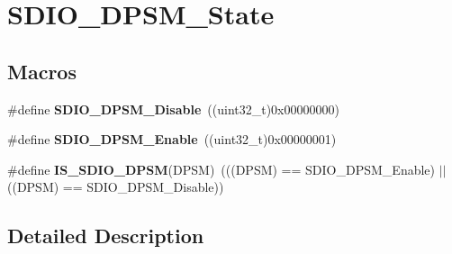 \hypertarget{group___s_d_i_o___d_p_s_m___state}{}\section{S\+D\+I\+O\+\_\+\+D\+P\+S\+M\+\_\+\+State}
\label{group___s_d_i_o___d_p_s_m___state}
\subsection*{Macros}
\begin{DoxyCompactItemize}
\item 
\hypertarget{group___s_d_i_o___d_p_s_m___state_ga156a9f6ab87a46dcb99ddd7462ca064b}{}\#define {\bfseries S\+D\+I\+O\+\_\+\+D\+P\+S\+M\+\_\+\+Disable}~((uint32\+\_\+t)0x00000000)\label{group___s_d_i_o___d_p_s_m___state_ga156a9f6ab87a46dcb99ddd7462ca064b}

\item 
\hypertarget{group___s_d_i_o___d_p_s_m___state_ga22bc12465c1cf839145619a859276c37}{}\#define {\bfseries S\+D\+I\+O\+\_\+\+D\+P\+S\+M\+\_\+\+Enable}~((uint32\+\_\+t)0x00000001)\label{group___s_d_i_o___d_p_s_m___state_ga22bc12465c1cf839145619a859276c37}

\item 
\hypertarget{group___s_d_i_o___d_p_s_m___state_gac87a2d7a8fc417a4514d733be50e6d63}{}\#define {\bfseries I\+S\+\_\+\+S\+D\+I\+O\+\_\+\+D\+P\+S\+M}(D\+P\+S\+M)~(((D\+P\+S\+M) == S\+D\+I\+O\+\_\+\+D\+P\+S\+M\+\_\+\+Enable) $\vert$$\vert$ ((D\+P\+S\+M) == S\+D\+I\+O\+\_\+\+D\+P\+S\+M\+\_\+\+Disable))\label{group___s_d_i_o___d_p_s_m___state_gac87a2d7a8fc417a4514d733be50e6d63}

\end{DoxyCompactItemize}


\subsection{Detailed Description}
